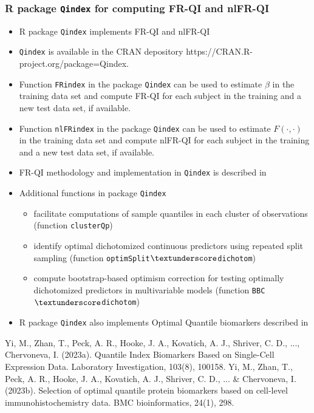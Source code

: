 \documentclass[t,8pt]{beamer}
\begin{document}
\frame
   {\frametitle{R package \texttt{Qindex} for computing FR-QI and nlFR-QI}
   
   \begin{itemize}	
	\item  R package \texttt{Qindex} implements FR-QI and nlFR-QI 
	\item  \texttt{Qindex} is available in the CRAN depository https://CRAN.R-project.org/package=Qindex.
     \item Function \texttt{FRindex} in the package \texttt{Qindex} can be used to estimate $\beta$ in the training data set and compute FR-QI for each subject in the training and a new test data set, if available.
          \item Function \texttt{nlFRindex} in the package \texttt{Qindex} can be used to estimate $F(·,·)$ in the training data set and compute nlFR-QI for each subject in the training and a new test data set, if available.
     \item FR-QI methodology and implementation in \texttt{Qindex} is described in \cite{Yi23}      	       
    \item Additional functions in package \texttt{Qindex} 
         \begin{itemize}
    \item facilitate computations of sample quantiles in each cluster of observations
   (function \texttt{clusterQp})
  \item  identify optimal dichotomized continuous predictors using repeated split sampling
  (function \texttt{optimSplit$\textunderscore$dichotom})
   \item  compute bootstrap-based optimism correction for testing optimally dichotomized predictors in multivariable models
   (function \texttt{BBC$\textunderscore$dichotom})
     \end{itemize}
   \item R package \texttt{Qindex} also implements Optimal Quantile biomarkers described in \cite{Yi23BMC}       
  \end{itemize}
\begin{thebibliography}{ }	
\begin{small}
Yi, M., Zhan, T., Peck, A. R., Hooke, J. A., Kovatich, A. J., Shriver, C. D., ..., Chervoneva, I. (2023a). Quantile Index Biomarkers Based on Single-Cell Expression Data. Laboratory Investigation, 103(8), 100158.
Yi, M., Zhan, T., Peck, A. R., Hooke, J. A., Kovatich, A. J., Shriver, C. D., ... & Chervoneva, I. (2023b). Selection of optimal quantile protein biomarkers based on cell-level immunohistochemistry data. BMC bioinformatics, 24(1), 298.
\end{small}
\end{thebibliography}	

}
\end{document}
